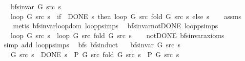 \begin{isabellebody}
\ \ \ {\isachardoublequoteopen}bfs{\isacharunderscore}{\kern0pt}invar{\isacharprime}{\kern0pt}\ G\ src\ s{\isachardoublequoteclose}\isanewline
\ \ \ {\isachardoublequoteopen}loop\ G\ src\ s\ {\isacharequal}{\kern0pt}\ {\isacharparenleft}{\kern0pt}if\ {\isasymnot}\ DONE\ s\ then\ loop\ G\ src\ {\isacharparenleft}{\kern0pt}fold\ G\ src\ s{\isacharparenright}{\kern0pt}\ else\ s{\isacharparenright}{\kern0pt}{\isachardoublequoteclose}%
\endisataginvisible
{\isafoldinvisible}%
%
\isadeliminvisible
\isanewline
%
\endisadeliminvisible
%
\isadelimproof
\ \ %
\endisadelimproof
%
\isatagproof
{}\isamarkupfalse%
\ assms\isanewline
\ \ \isamarkupfalse%
\ {\isacharparenleft}{\kern0pt}metis\ bfs{\isacharunderscore}{\kern0pt}invar{\isachardot}{\kern0pt}loop{\isacharunderscore}{\kern0pt}dom\ loop{\isachardot}{\kern0pt}psimps{\isacharparenright}{\kern0pt}%
\endisatagproof
{\isafoldproof}%
%
\isadelimproof
\isanewline
%
\endisadelimproof
%
\isadeliminvisible
\isanewline
%
\endisadeliminvisible
%
\isataginvisible
{}\isamarkupfalse%
\ {\isacharparenleft}{\kern0pt}\ bfs{\isacharunderscore}{\kern0pt}invar{\isacharunderscore}{\kern0pt}not{\isacharunderscore}{\kern0pt}DONE{\isacharparenright}{\kern0pt}\ loop{\isacharunderscore}{\kern0pt}psimps{\isacharcolon}{\kern0pt}\isanewline
\ \ \ {\isachardoublequoteopen}loop\ G\ src\ s\ {\isacharequal}{\kern0pt}\ loop\ G\ src\ {\isacharparenleft}{\kern0pt}fold\ G\ src\ s{\isacharparenright}{\kern0pt}{\isachardoublequoteclose}%
\endisataginvisible
{\isafoldinvisible}%
%
\isadeliminvisible
\isanewline
%
\endisadeliminvisible
%
\isadelimproof
\ \ %
\endisadelimproof
%
\isatagproof
{}\isamarkupfalse%
\ not{\isacharunderscore}{\kern0pt}DONE\ bfs{\isacharunderscore}{\kern0pt}invar{\isacharunderscore}{\kern0pt}axioms\isanewline
\ \ \isamarkupfalse%
\ {\isacharparenleft}{\kern0pt}simp\ add{\isacharcolon}{\kern0pt}\ loop{\isacharunderscore}{\kern0pt}psimps{\isacharparenright}{\kern0pt}%
\endisatagproof
{\isafoldproof}%
%
\isadelimproof
\isanewline
%
\endisadelimproof
%
\isadeliminvisible
\isanewline
%
\endisadeliminvisible
%
\isataginvisible
{}\isamarkupfalse%
\ {\isacharparenleft}{\kern0pt}\ bfs{\isacharparenright}{\kern0pt}\ bfs{\isacharunderscore}{\kern0pt}induct{\isacharcolon}{\kern0pt}\isanewline
\ \ \ {\isachardoublequoteopen}bfs{\isacharunderscore}{\kern0pt}invar{\isacharprime}{\kern0pt}\ G\ src\ s{\isachardoublequoteclose}\isanewline
\ \ \ {\isachardoublequoteopen}{\isasymAnd}G\ src\ s{\isachardot}{\kern0pt}\ {\isacharparenleft}{\kern0pt}{\isasymnot}\ DONE\ s\ {\isasymLongrightarrow}\ P\ G\ src\ {\isacharparenleft}{\kern0pt}fold\ G\ src\ s{\isacharparenright}{\kern0pt}{\isacharparenright}{\kern0pt}\ {\isasymLongrightarrow}\ P\ G\ src\ s{\isachardoublequoteclose}\isanewline

\end{isabellebody}
